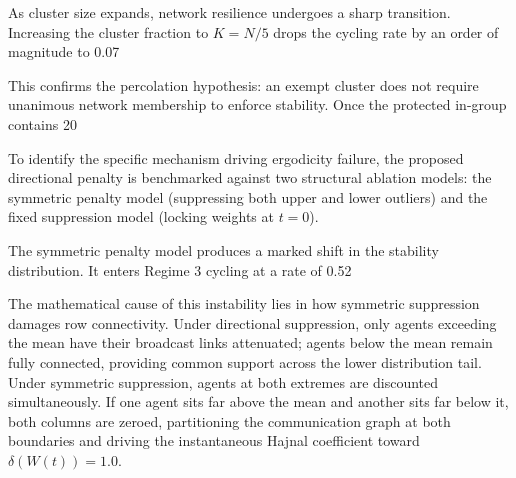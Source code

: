 As cluster size expands, network resilience undergoes a sharp transition\cite{degroot1974reaching}. Increasing the cluster fraction to $K = N/5$ drops the cycling rate by an order of magnitude to 0.07%

This confirms the percolation hypothesis: an exempt cluster does not require unanimous network membership to enforce stability\cite{degroot1974reaching,hajnal1958weak}. Once the protected in-group contains 20%

To identify the specific mechanism driving ergodicity failure, the proposed directional penalty is benchmarked against two structural ablation models: the symmetric penalty model (suppressing both upper and lower outliers) and the fixed suppression model (locking weights at $t = 0$)\cite{degroot1974reaching}.

The symmetric penalty model produces a marked shift in the stability distribution\cite{acemoglu2013opinion}. It enters Regime 3 cycling at a rate of 0.52%

The mathematical cause of this instability lies in how symmetric suppression damages row connectivity\cite{degroot1974reaching}. Under directional suppression, only agents exceeding the mean have their broadcast links attenuated; agents below the mean remain fully connected, providing common support across the lower distribution tail\cite{degroot1974reaching,acemoglu2013opinion}. Under symmetric suppression, agents at both extremes are discounted simultaneously\cite{degroot1974reaching}. If one agent sits far above the mean and another sits far below it, both columns are zeroed, partitioning the communication graph at both boundaries and driving the instantaneous Hajnal coefficient toward $\delta(W(t)) = 1.0$\cite{degroot1974reaching,acemoglu2013opinion}.

